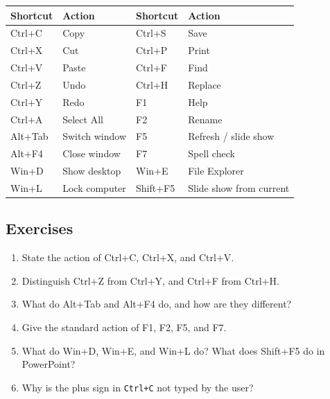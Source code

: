\documentclass[11pt]{article}
\begin{document}
\begin{center}
\begin{tabular}{p{}p{}p{}p{}}
\toprule
\textbf{Shortcut} & \textbf{Action} & \textbf{Shortcut} & \textbf{Action} \\
\midrule
Ctrl+C & Copy & Ctrl+S & Save \\
Ctrl+X & Cut & Ctrl+P & Print \\
Ctrl+V & Paste & Ctrl+F & Find \\
Ctrl+Z & Undo & Ctrl+H & Replace \\
Ctrl+Y & Redo & F1 & Help \\
Ctrl+A & Select All & F2 & Rename \\
Alt+Tab & Switch window & F5 & Refresh / slide show \\
Alt+F4 & Close window & F7 & Spell check \\
Win+D & Show desktop & Win+E & File Explorer \\
Win+L & Lock computer & Shift+F5 & Slide show from current \\
\bottomrule
\end{tabular}
\end{center}

\subsection*{Exercises}
\begin{enumerate}[label=\arabic*.]
  \item State the action of Ctrl+C, Ctrl+X, and Ctrl+V.
  \item Distinguish Ctrl+Z from Ctrl+Y, and Ctrl+F from Ctrl+H.
  \item What do Alt+Tab and Alt+F4 do, and how are they different?
  \item Give the standard action of F1, F2, F5, and F7.
  \item What do Win+D, Win+E, and Win+L do? What does Shift+F5 do in
    PowerPoint?
  \item Why is the plus sign in \texttt{Ctrl+C} not typed by the user?
\end{enumerate}
\end{document}
